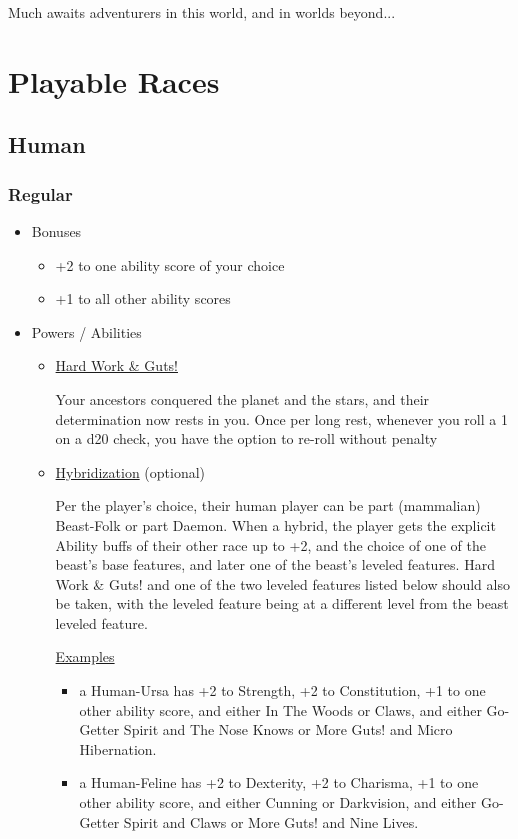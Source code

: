 \documentclass[12pt, landscape]{article}
\begin{document}
\begin{FlushLeft}
\begin{multicols}{2}
			Much awaits adventurers in this world, and in worlds beyond...
			\vfill
			\pagebreak

			\section{Playable Races}
			\subsection{Human}
			\subsubsection{Regular}
			\begin{itemize}[wide]
				\item Bonuses
				\begin{itemize}
					\item +2 to one ability score of your choice
					\item +1 to all other ability scores
				\end{itemize}
				\item Powers  / Abilities
				\begin{itemize}
					\item \underline{Hard Work \& Guts!}

					Your ancestors conquered the planet and the stars, and their determination now rests in you. Once per long rest, whenever you roll a 1 on a d20 check, you have the option to re-roll without penalty

					\item \underline{Hybridization} (optional)

					Per the player’s choice, their human player can be part (mammalian) Beast-Folk or part Daemon.
					When a hybrid, the player gets the explicit Ability buffs of their other race up to +2, and the choice of one of the beast’s base features, and later one of the beast’s leveled features.
					Hard Work \& Guts! and one of the two leveled features listed below should also be taken, with the leveled feature being at a different level from the beast leveled feature.

					\underline{Examples}
					\begin{itemize}
						\item a Human-Ursa has +2 to Strength, +2 to Constitution, +1 to one other ability score, and either In The Woods or Claws, and either Go-Getter Spirit and The Nose Knows or More Guts! and Micro Hibernation.
						\item a Human-Feline has +2 to Dexterity, +2 to Charisma, +1 to one other ability score, and either Cunning or Darkvision, and either Go-Getter Spirit and Claws or More Guts! and Nine Lives.
					\end{itemize}


\end{itemize}
\end{itemize}
\end{multicols}
\end{FlushLeft}
\end{document}

